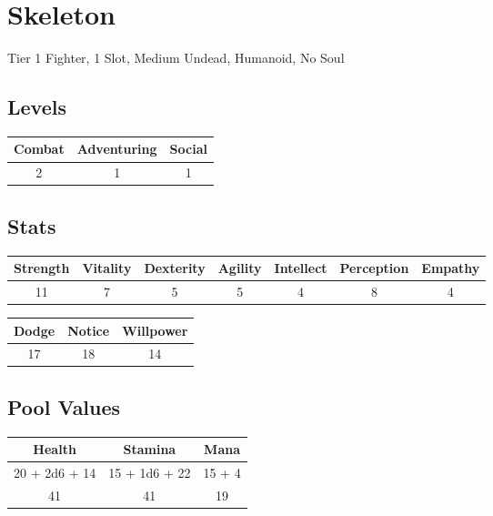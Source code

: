 \section{Skeleton}
Tier 1 Fighter, 1 Slot, Medium Undead, Humanoid, No Soul\\

\subsection{Levels}
\begin{minipage}[H]{1\textwidth}
    \centering
    \begin{tabular}[c]{|c | c | c|}
        \hline
        Combat & Adventuring & Social\\
        \hline
        2 & 1 & 1\\
        \hline
    \end{tabular}
\end{minipage}

\subsection{Stats}
\begin{minipage}[H]{1\textwidth}
    \centering
    \begin{tabular}[c]{|c | c | c | c | c | c | c|}
        \hline
        Strength & Vitality & Dexterity & Agility & Intellect & Perception & Empathy\\
        \hline
        11 & 7 & 5 & 5 & 4 & 8 & 4\\
        \hline
    \end{tabular}
\end{minipage}

\begin{minipage}[H]{1\textwidth}
    \centering
    \begin{tabular}[c]{|c | c | c|}
        \hline
        Dodge & Notice & Willpower\\
        \hline
        17 & 18 & 14\\
        \hline
    \end{tabular}
\end{minipage}

\subsection{Pool Values}
\begin{minipage}[H]{1\textwidth}
    \centering
    \begin{tabular}[c]{|c | c | c|}
        \hline
        Health & Stamina & Mana\\
        \hline
        20 + 2d6 + 14 & 15 + 1d6 + 22 & 15 + 4\\
        41 & 41 & 19\\
        \hline
    \end{tabular}
\end{minipage}


